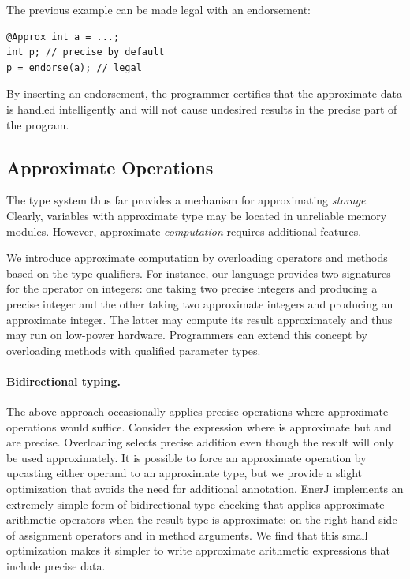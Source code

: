 The previous example can be made legal with an endorsement:
\begin{lstlisting}
@Approx int a = ...;
int p; // precise by default
p = endorse(a); // legal
\end{lstlisting}
By inserting an endorsement,
the programmer certifies that the approximate data is handled
intelligently and will not cause undesired results in the precise part of
the program.


\subsection{Approximate Operations}
\label{enerj:sec:approx}

The type system thus far provides a mechanism for approximating
\emph{storage}. Clearly, variables with approximate type may be
located in unreliable memory modules. However,
approximate \emph{computation} requires additional features. %

We introduce approximate computation by overloading operators and
methods based on the type qualifiers. For instance, our
language provides two signatures for the \ilcode{+} operator on
integers: one taking two precise integers and producing a precise
integer and the other taking two approximate integers and producing an
approximate integer. The latter may compute its result
approximately and thus may run on low-power hardware.
Programmers can extend this concept by overloading methods with
qualified parameter types.

\paragraph{Bidirectional typing.}
The above approach occasionally applies precise operations where
approximate operations would suffice. Consider the expression 
where  is approximate but  and  are
precise. Overloading selects precise addition even
though the result will only be used approximately. It is possible to force
an approximate operation by upcasting either operand to an approximate
type, but we provide a slight optimization that avoids the need for additional
annotation.
EnerJ implements an extremely simple form of bidirectional type checking
\cite{bdtyping} that applies approximate arithmetic operators
when the result type is approximate: on the right-hand side of assignment
operators and in method arguments. We find that this small optimization makes
it simpler to write approximate arithmetic expressions that include precise
data.


